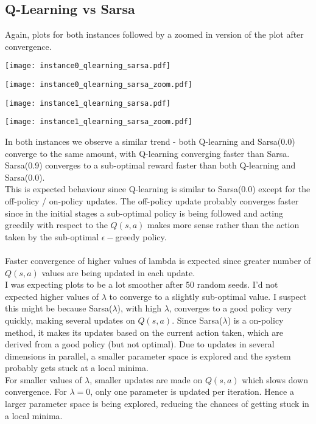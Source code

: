 \documentclass[11pt]{article}
\begin{document}
\subsection{Q-Learning vs Sarsa}
Again, plots for both instances followed by a zoomed in version of the plot after convergence.
\begin{center}
\texttt{[image: instance0\_qlearning\_sarsa.pdf]}
\end{center}
\begin{center}
\texttt{[image: instance0\_qlearning\_sarsa\_zoom.pdf]}
\end{center}
\begin{center}
\texttt{[image: instance1\_qlearning\_sarsa.pdf]}
\end{center}
\begin{center}
\texttt{[image: instance1\_qlearning\_sarsa\_zoom.pdf]}
\end{center}
In both instances we observe a similar trend - both Q-learning and Sarsa(0.0) converge to the same amount, with Q-learning converging faster than Sarsa. Sarsa(0.9) converges to a sub-optimal reward faster than both Q-learning and Sarsa(0.0).\\
This is expected behaviour since Q-learning is similar to Sarsa(0.0) except for the off-policy / on-policy updates. The off-policy update probably converges faster since in the initial stages a sub-optimal policy is being followed and acting greedily with respect to the $Q(s,a)$ makes more sense rather than the action taken by the sub-optimal $\epsilon-$greedy policy.\\\\
Faster convergence of higher values of lambda is expected since greater number of $Q(s,a)$ values are being updated in each update.\\
I was expecting plots to be a lot smoother after 50 random seeds. I'd not expected higher values of $\lambda$ to converge to a slightly sub-optimal value. I suspect this might be because Sarsa($\lambda$), with high $\lambda$, converges to a good policy very quickly, making several updates on $Q(s,a)$. Since Sarsa($\lambda$) is a on-policy method, it makes its updates based on the current action taken, which are derived from a good policy (but not optimal). Due to updates in several dimensions in parallel, a smaller parameter space is explored and the system probably gets stuck at a local minima.\\
For smaller values of $\lambda$, smaller updates are made on $Q(s,a)$ which slows down convergence. For $\lambda = 0$, only one parameter is updated per iteration. Hence a larger parameter space is being explored, reducing the chances of getting stuck in a local minima.
\end{document}
